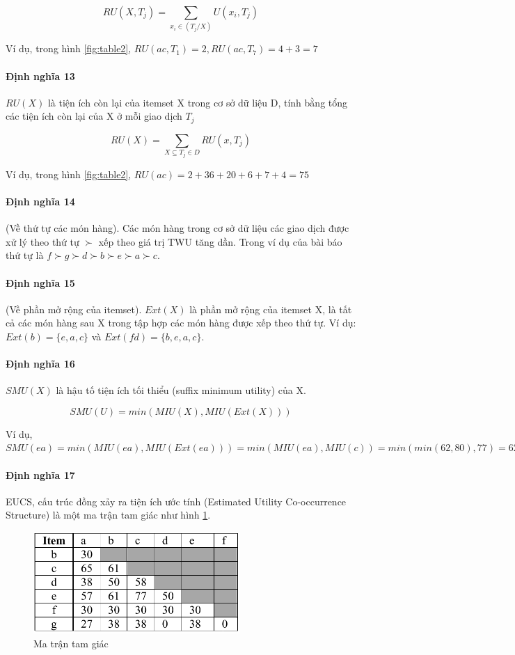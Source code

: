 $$ RU(X, T_j) = \sum_{x_i \in (T_j/X)} U(x_i, T_j) $$

Ví dụ, trong hình \ref{fig:table2}, $RU(ac, T_1) = 2, RU(ac, T_7) = 4 + 3 = 7 $  

\paragraph{Định nghĩa 13} $RU(X)$ là tiện ích còn lại của itemset X trong cơ sở dữ liệu D, tính bằng tổng các tiện ích còn lại của X ở mỗi giao dịch $T_j$

$$ RU(X) = \sum_{X \subseteq T_j \in D} RU(x, T_j) $$

Ví dụ, trong hình \ref{fig:table2}, $RU(ac) = 2 + 36 + 20 + 6 + 7 + 4 = 75$

\paragraph{Định nghĩa 14} (Về thứ tự các món hàng). Các món hàng trong cơ sở dữ liệu các giao dịch được xử lý theo thứ tự $\succ$ xếp theo giá trị TWU tăng dần. Trong ví dụ của bài báo thứ tự là $ f \succ g \succ d \succ b \succ e \succ a \succ c $.

\paragraph{Định nghĩa 15} (Về phần mở rộng của itemset). $Ext(X)$ là phần mở rộng của itemset X, là tất cả các món hàng sau X trong tập hợp các món hàng được xếp theo thứ tự. Ví dụ: $Ext(b) = \{ e, a, c \}$ và $Ext(fd) = \{b, e, a, c \}$.

\paragraph{Định nghĩa 16} $SMU(X)$ là hậu tố tiện ích tối thiểu (suffix minimum utility) của X. 

$$ SMU(U) = min(MIU(X), MIU(Ext(X))) $$

Ví dụ, $SMU(ea) = min(MIU(ea), MIU(Ext(ea))) = min (MIU(ea), MIU(c)) = min(min(62, 80), 77) = 62$

\paragraph{Định nghĩa 17} EUCS, cấu trúc đồng xảy ra tiện ích ước tính (Estimated Utility Co-occurrence Structure) \cite{fournier2014fhm} là một ma trận tam giác như hình \ref{fig:eucs}.

\begin{figure}[h]
\centering
\includegraphics[width=0.7\textwidth]{image/fig/trianglematrix.PNG}
\caption{\label{fig:eucs} Ma trận tam giác  }
\end{figure}

